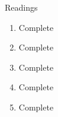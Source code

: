 \documentclass[11pt]{article}
\begin{document}
Readings
\begin{enumerate}[1)]
	\item Complete
	\item Complete
	\item Complete
	\item Complete
	\item Complete
\end{enumerate}
\end{document}
